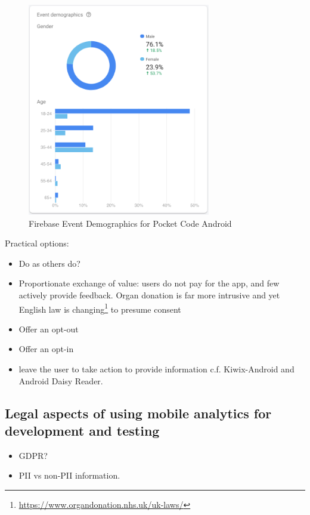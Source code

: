 \begin{figure}[htbp!]
    \centering
    \includegraphics[width=8cm]{images/firebase/Firebase-event-demographics-pocketcode-android.png}
    \caption{Firebase Event Demographics for Pocket Code Android}
    \label{fig:Firebase-event-demographics-pocketcode-android}
\end{figure}

Practical options:
\begin{itemize}
    \item Do as others do?
    \item Proportionate exchange of value: users do not pay for the app, and few actively provide feedback. Organ donation is far more intrusive and yet English law is changing\footnote{\url{https://www.organdonation.nhs.uk/uk-laws/}} to presume consent\cite{NHS_organ_donation_in_england} 
    \item Offer an opt-out
    \item Offer an opt-in
    \item leave the user to take action to provide information c.f. Kiwix-Android and Android Daisy Reader.
\end{itemize}

\subsection{Legal aspects of using mobile analytics for development and testing}

\begin{itemize}
    \item GDPR?
    \item PII vs non-PII information.
\end{itemize}

